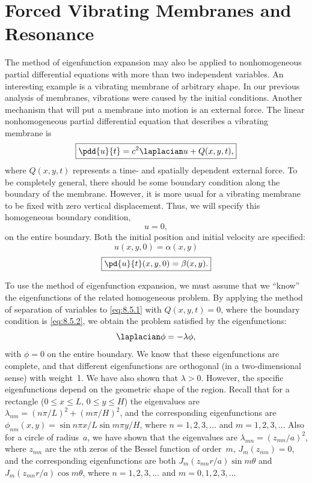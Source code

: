 \section{Forced Vibrating Membranes and Resonance}
\label{sec:forced-membranes}

The method of eigenfunction expansion may also be applied to nonhomogeneous partial differential equations with more than two independent variables.  An interesting example is a vibrating membrane of arbitrary shape.  In our previous analysis of membranes, vibrations were caused by the initial conditions.  Another mechanism that will put a membrane into motion is an external force.  The linear nonhomogeneous partial differential equation that describes a vibrating membrane is
\begin{equation}
\label{eq:8.5.1}
\boxed{\pdd{u}{t} = c^2\laplacian u + Q(x,y,t),}
\end{equation}
where $Q(x,y,t)$ represents a time- and spatially dependent external force.  To be completely general, there should be some boundary condition along the boundary of the membrane.  However, it is more usual for a vibrating membrane to be fixed with zero vertical displacement.  Thus, we will specify this homogeneous boundary condition,
\begin{equation}
\label{eq:8.5.2}
\boxed{u = 0,}
\end{equation}
on the entire boundary.  Both the initial position and initial velocity are specified:
\begin{equation}
\label{eq:8.5.3}
\boxed{u(x,y,0) = \alpha(x,y)}
\end{equation}
\begin{equation}
\label{eq:8.5.4}
\boxed{\pd{u}{t}(x,y,0) = \beta(x,y).}
\end{equation}

To use the method of eigenfunction expansion, we must assume that we ``know'' the eigenfunctions of the related homogeneous problem.  By applying the method of separation of variables to \eqref{eq:8.5.1} with $Q(x,y,t) = 0$, where the boundary condition is \eqref{eq:8.5.2}, we obtain the problem satisfied by the eigenfunctions:
\begin{equation}
\label{eq:8.5.5}
\laplacian\phi = -\lambda\phi,
\end{equation}
with $\phi = 0$ on the entire boundary.  We know that these eigenfunctions are complete, and that different eigenfunctions are orthogonal (in a two-dimensional sense) with weight~1.  We have also shown that $\lambda > 0$.  However, the specific eigenfunctions depend on the geometric shape of the region.  Recall that for a rectangle ($0\le x\le L$, $0\le y\le H$) the eigenvalues are $\lambda_{nm} = (n\pi/L)^2 + (m\pi/H)^2$, and the corresponding eigenfunctions are $\phi_{nm}(x,y) = \sin n\pi x/L\sin m\pi y/H$, where $n=1,2,3,\ldots$ and $m=1,2,3,\ldots$  Also for a circle of radius~$a$, we have shown that the eigenvalues are $\lambda_{mn} = (z_{mn}/a)^2$, where $z_{mn}$ are the $n$th zeros of the Bessel function of order~$m$, $J_m(z_{mn}) = 0$, and the corresponding eigenfunctions are both $J_m(z_{mn}r/a)\sin m\theta$ and $J_m(z_{mn}r/a)\cos m\theta$, where $n=1,2,3,\ldots$ and $m=0,1,2,3,\ldots$

